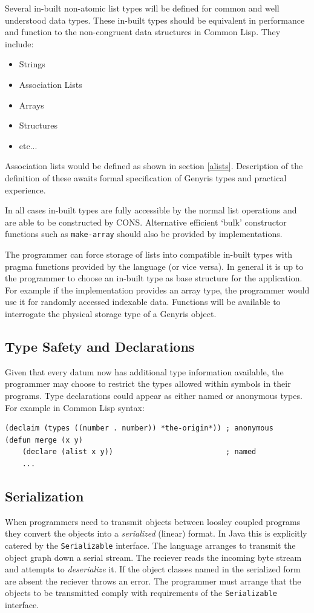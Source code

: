 \documentclass[a4paper,12pt,dvips]{article}
\begin{document}
Several in-built non-atomic list types will be defined for common and well understood data types. These in-built types should be equivalent in performance and function to the non-congruent data structures in Common Lisp. They include: 
\begin{itemize}
\item{Strings}
\item{Association Lists}
\item{Arrays}
\item{Structures}
\item{etc...}
\end{itemize}
Association lists would be defined as shown in section \ref{alists}. Description of the definition of these awaits formal specification of Genyris types and practical experience.  

In all cases in-built types are fully accessible by the normal list operations and are able to be constructed by CONS. Alternative efficient `bulk' constructor functions such as \texttt{make-array} should also be provided by implementations.

The programmer can force storage of lists into compatible in-built types with pragma functions provided by the language (or vice versa). In general it is up to the programmer to choose an in-built type as base structure for the application. For example if the implementation provides an array type, the programmer would use it for randomly accessed indexable data.   Functions will be available to interrogate the physical storage type of a Genyris object.

\subsection{Type Safety and Declarations}
Given that every datum now has additional type information available, the programmer may choose to restrict the types allowed within symbols in their programs. Type declarations could appear as either named or anonymous types. For example in Common Lisp syntax:
\begin{verbatim}
(declaim (types ((number . number)) *the-origin*)) ; anonymous
(defun merge (x y)
    (declare (alist x y))                          ; named
    ...
\end{verbatim}
\subsection{Serialization}
When programmers need to transmit objects between loosley coupled programs they convert the objects into a \emph{serialized} (linear) format. In Java \cite{java} this is explicitly catered by the \texttt{Serializable} interface. The language arranges to transmit the object graph down a serial stream. The reciever reads the incoming byte stream and attempts to \emph{deserialize} it. If the object classes named in the serialized form are absent the reciever throws an error.  The programmer must arrange that the objects to be transmitted comply with requirements of the \texttt{Serializable} interface.
\end{document}
